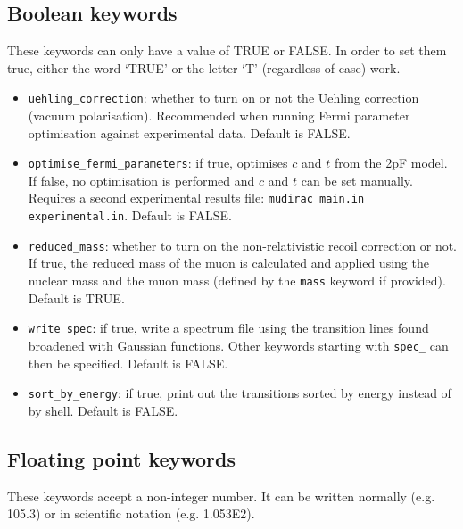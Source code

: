 \documentclass[]{article}
\begin{document}
\subsection{Boolean keywords}

These keywords can only have a value of TRUE or FALSE. In order to set them true, either the word `TRUE' or the letter `T' (regardless of case) work.

\begin{itemize}
	\item \texttt{uehling\_correction}: whether to turn on or not the Uehling correction (vacuum polarisation). Recommended when running Fermi parameter optimisation against experimental data. Default is FALSE.
	\item \texttt{optimise\_fermi\_parameters}: if true, optimises $c$ and $t$ from the 2pF model. If false, no optimisation is performed and $c$ and $t$ can be set manually. Requires a second experimental results file: \texttt{mudirac main.in experimental.in}. Default is FALSE.
	\item \texttt{reduced\_mass}: whether to turn on the non-relativistic recoil correction or not. If true, the reduced mass of the muon is calculated and applied using the nuclear mass and the muon mass (defined by the \texttt{mass} keyword if provided). Default is TRUE.
	\item \texttt{write\_spec}: if true, write a spectrum file using the transition lines found broadened with Gaussian functions. Other keywords starting with \texttt{spec\_} can then be specified. Default is FALSE.
	\item \texttt{sort\_by\_energy}: if true, print out the transitions sorted by energy instead of by shell. Default is FALSE.
\end{itemize}

\subsection{Floating point keywords}

These keywords accept a non-integer number. It can be written normally (e.g. 105.3) or in scientific notation (e.g. 1.053E2).
\end{document}
